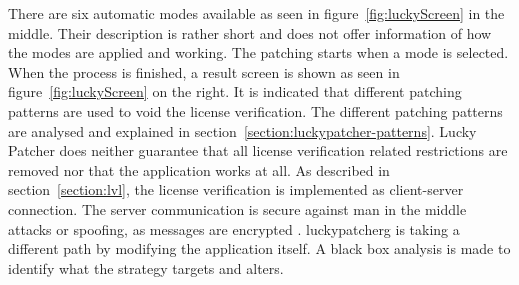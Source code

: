 \newline
There are six automatic modes available as seen in figure~\ref{fig:luckyScreen} in the middle.
Their description is rather short and does not offer information of how the modes are applied and working.
\newline
The patching starts when a mode is selected.
When the process is finished, a result screen is shown as seen in figure~\ref{fig:luckyScreen} on the right.
It is indicated that different patching patterns are used to void the license verification.
The different patching patterns are analysed and explained in section~\ref{section:luckypatcher-patterns}.
\newline
Lucky Patcher does neither guarantee that all license verification related restrictions are removed nor that the application works at all.
\newline
\newline
As described in section~\ref{section:lvl}, the license verification is implemented as client-server connection.
The server communication is secure against man in the middle attacks or spoofing, as messages are encrypted \cite{munteanLicense}.
\gls{luckypatcherg} is taking a different path by modifying the application itself.
A black box analysis is made to identify what the strategy targets and alters.
